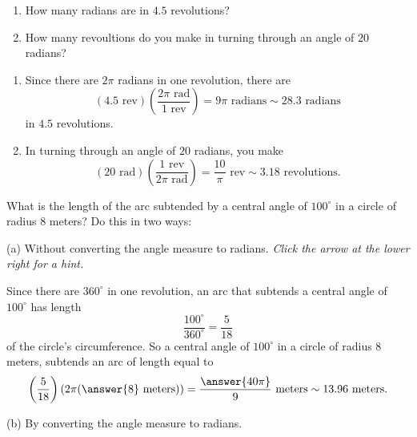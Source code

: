 \documentclass{ximera}
\begin{document}
\begin{question}  \label{Q43:Angles}
\begin{enumerate}
\item How many radians are in $4.5$ revolutions?

\item How many revoultions do you make in turning through an angle of $20$ radians?

\end{enumerate}
\begin{explanation}
\begin{enumerate}
\item Since there are $2\pi$ radians in one revolution, there are 
\[
   (4.5 \text{ rev})  \left( \frac{2\pi \text{ rad}}{1 \text{ rev}}  \right)  = 9\pi \text{ radians} \sim 28.3 \text{ radians}
\]
in $4.5$ revolutions.

\item In turning through an angle of $20$ radians, you make
\[
    (20\text{ rad}) \left( \frac{1 \text{ rev}}{2\pi \text{ rad}}  \right) = \frac{10}{\pi} \text{ rev} \sim 3.18 \text{ revolutions} .
\]
\end{enumerate}
\end{explanation}
\end{question}


\begin{question} \label{Q873:Radians}
What is the length of the arc subtended by a central angle of $100^\circ$ in a circle of radius $8$ meters? Do this in two ways:

(a) Without converting the angle measure to radians. \emph{Click the arrow at the lower right for a hint.}

\begin{expandable}
Since there are $360^\circ$ in one revolution, an arc that subtends a central angle of $100^\circ$ has length
\[
        \frac{100^\circ}{360^\circ} = \frac{5}{18}
\]
of the circle's circumference. So a central angle of $100^\circ$ in a circle of radius $8$ meters, subtends an arc of length equal to 
\[
    \left( \frac{5}{18} \right) (2\pi (\answer{8} \text{ meters})) = \frac{\answer{40\pi}}{9} \text{ meters} \sim 13.96 \text{ meters} .
\]
\end{expandable}

(b) By converting the angle measure to radians.
\end{question}
\end{document}
